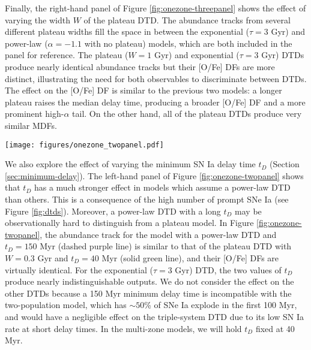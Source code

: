 \documentclass[twocolumn,twocolappendix,linenumbers]{aastex631}
\begin{document}
Finally, the right-hand panel of Figure \ref{fig:onezone-threepanel} shows the effect of varying the width $W$ of the plateau DTD. The abundance tracks from several different plateau widths fill the space in between the exponential ($\tau=3$ Gyr) and power-law ($\alpha=-1.1$ with no plateau) models, which are both included in the panel for reference. The plateau ($W=1$ Gyr) and exponential ($\tau=3$ Gyr) DTDs produce nearly identical abundance tracks but their [O/Fe] DFs are more distinct, illustrating the need for both observables to discriminate between DTDs. The effect on the [O/Fe] DF is similar to the previous two models: a longer plateau raises the median delay time, producing a broader [O/Fe] DF and a more prominent high-$\alpha$ tail. On the other hand, all of the plateau DTDs produce very similar MDFs.

\begin{figure*}
    \centering
    \texttt{[image: figures/onezone\_twopanel.pdf]}
    \caption{\textit{Left:} Comparison of one-zone models with different combinations of minimum delay time $t_D$ and DTD shape.
    The layout is similar to Figure \ref{fig:onezone-threepanel}. For visual clarity, we assume a mass-loading factor $\eta=1$ for the exponential DTD curves, which places the end-point of the abundance tracks at higher [Fe/H].
    \textit{Right:} Comparison of one-zone models with five different DTD models (see Figure \ref{fig:dtds}).
    }
    \label{fig:onezone-twopanel}
\end{figure*}

We also explore the effect of varying the minimum SN Ia delay time $t_D$ (Section \ref{sec:minimum-delay}).
The left-hand panel of Figure \ref{fig:onezone-twopanel} shows that $t_D$ has a much stronger effect in models which assume a power-law DTD than others. This is a consequence of the high number of prompt SNe Ia (see Figure \ref{fig:dtds}). Moreover, a power-law DTD with a long $t_D$ may be observationally hard to distinguish from a plateau model. In Figure \ref{fig:onezone-twopanel}, the abundance track for the model with a power-law DTD and $t_D=150$ Myr (dashed purple line) is similar to that of the plateau DTD with $W=0.3$ Gyr and $t_D=40$ Myr (solid green line), and their [O/Fe] DFs are virtually identical. For the exponential ($\tau=3$ Gyr) DTD, the two values of $t_D$ produce nearly indistinguishable outputs. We do not consider the effect on the other DTDs because a 150 Myr minimum delay time is incompatible with the two-population model, which has $\sim 50$\% of SNe Ia explode in the first 100 Myr, and would have a negligible effect on the triple-system DTD due to its low SN Ia rate at short delay times.
In the multi-zone models, we will hold $t_D$ fixed at 40 Myr.
\end{document}
